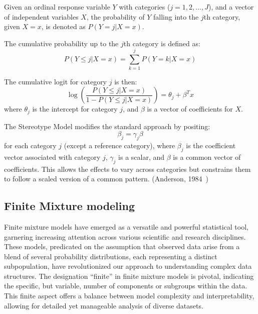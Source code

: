\documentclass{article}
\begin{document}
Given an ordinal response variable $Y$ with categories ($j=1, 2, \ldots, J$), and a vector of independent variables $X$, the probability of $Y$ falling into the $j$th category, given $X = x$, is denoted as $P(Y = j | X = x)$.

The cumulative probability up to the $j$th category is defined as:
\[
P(Y \leq j | X = x) = \sum_{k=1}^{j} P(Y = k | X = x)
\]

The cumulative logit for category $j$ is then:
\[
\log\left(\frac{P(Y \leq j | X = x)}{1 - P(Y \leq j | X = x)}\right) = \theta_j + \beta^T x
\]
where $\theta_j$ is the intercept for category $j$, and $\beta$ is a vector of coefficients for $X$.

The Stereotype Model modifies the standard approach by positing:
\[
\beta_j = \gamma_j \beta
\]
for each category $j$ (except a reference category), where $\beta_j$ is the coefficient vector associated with category $j$, $\gamma_j$ is a scalar, 
and $\beta$ is a common vector of coefficients. This allows the effects to vary across categories but constrains them to follow a scaled version of a common pattern. (Anderson, 1984~\cite{anderson1984regression})


\subsection{Finite Mixture modeling}

Finite mixture models have emerged as a versatile and powerful statistical tool, garnering increasing attention across various scientific and research disciplines. These models, predicated on the assumption that observed data arise from a blend of several probability distributions, each representing a distinct subpopulation, have revolutionized our approach to understanding complex data structures. The designation ``finite'' in finite mixture models is pivotal, indicating the specific, but variable, number of components or subgroups within the data. This finite aspect offers a balance between model complexity and interpretability, allowing for detailed yet manageable analysis of diverse datasets.
\end{document}
